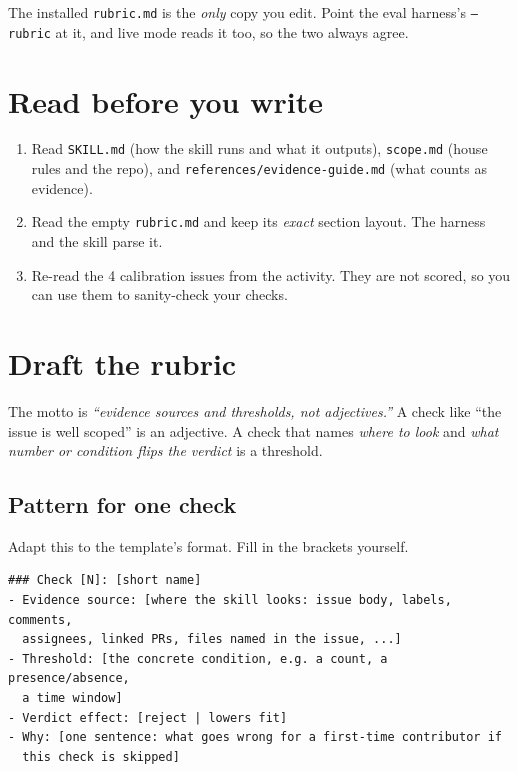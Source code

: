 \documentclass[11pt]{article}
\begin{document}
\begin{notebox}
The installed \texttt{rubric.md} is the \emph{only} copy you edit. Point the eval harness's
\texttt{--rubric} at it, and live mode reads it too, so the two always agree.
\end{notebox}

\section{Read before you write}
\begin{enumerate}[label=\textbf{3.\arabic*}]
  \item Read \texttt{SKILL.md} (how the skill runs and what it outputs), \texttt{scope.md} (house rules and the repo),
        and \texttt{references/evidence-guide.md} (what counts as evidence).
  \item Read the empty \texttt{rubric.md} and keep its \emph{exact} section layout. The harness and the skill parse it.
  \item Re-read the 4 calibration issues from the activity. They are not scored, so you can use them to sanity-check your checks.
\end{enumerate}

\section{Draft the rubric}
The motto is \emph{``evidence sources and thresholds, not adjectives.''} A check like ``the issue is well scoped''
is an adjective. A check that names \emph{where to look} and \emph{what number or condition flips the verdict} is a threshold.

\subsection*{Pattern for one check}
Adapt this to the template's format. Fill in the brackets yourself.
\begin{lstlisting}
### Check [N]: [short name]
- Evidence source: [where the skill looks: issue body, labels, comments,
  assignees, linked PRs, files named in the issue, ...]
- Threshold: [the concrete condition, e.g. a count, a presence/absence,
  a time window]
- Verdict effect: [reject | lowers fit]
- Why: [one sentence: what goes wrong for a first-time contributor if
  this check is skipped]
\end{lstlisting}
\end{document}
